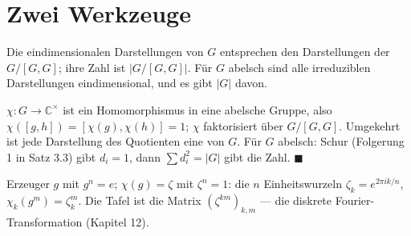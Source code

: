 \begin{merksatz}
\begin{center}
\begin{minipage}{0.88\textwidth}
\end{minipage}
\end{center}
\end{merksatz}

\section{Zwei Werkzeuge}

\begin{merksatz}
Die eindimensionalen Darstellungen von $G$ entsprechen den Darstellungen der  $G/[G, G]$; ihre Zahl ist $|G/[G, G]|$. Für $G$ abelsch sind alle irreduziblen Darstellungen eindimensional, und es gibt $|G|$ davon.

$\chi\colon G\to\mathbb C^{\times}$ ist ein Homomorphismus in eine abelsche Gruppe, also $\chi([g, h]) = [\chi(g), \chi(h)] = 1$; $\chi$ faktorisiert über $G/[G, G]$. Umgekehrt ist jede Darstellung des Quotienten eine von $G$. Für $G$ abelsch: Schur (Folgerung 1 in Satz 3.3) gibt $d_i = 1$, dann $\sum d_i^{2} = |G|$ gibt die Zahl. $\blacksquare$

Erzeuger $g$ mit $g^{n} = e$; $\chi(g) = \zeta$ mit $\zeta^{n} = 1$: die $n$ Einheitswurzeln $\zeta_k = e^{2\pi ik/n}$, $\chi_k(g^{m}) = \zeta_k^{m}$. Die Tafel ist die Matrix $(\zeta^{km})_{k, m}$ --- die diskrete Fourier-Transformation (Kapitel 12).
\end{merksatz}

